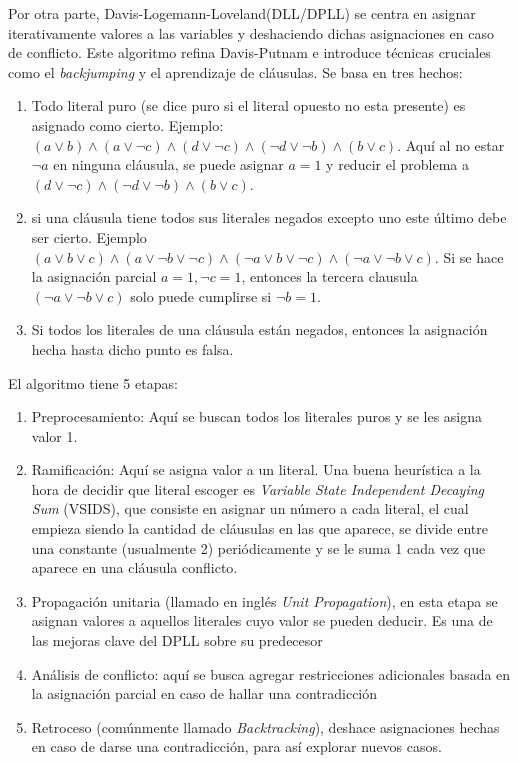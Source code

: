 \documentclass[12pt]{report}
\begin{document}
Por otra parte, Davis-Logemann-Loveland(DLL/DPLL) se centra en asignar iterativamente valores a las variables y deshaciendo dichas asignaciones en caso de conflicto. Este algoritmo refina Davis-Putnam e introduce técnicas cruciales como el \textit{backjumping} y el aprendizaje de cláusulas. Se basa en tres hechos: 
\begin{enumerate}
    \item Todo literal puro (se dice puro si el literal opuesto no esta presente) es asignado como cierto. Ejemplo: $(a\lor  b) \land (a\lor  \neg c) \land (d\lor  \neg c) \land (\neg d\lor  \neg b) \land (b\lor  c) $. Aquí al no estar $\neg a$ en ninguna cláusula, se puede asignar $a=1$ y reducir el problema a $(d\lor  \neg c) \land (\neg d\lor  \neg b) \land (b\lor  c) $.
    \item si una cláusula tiene todos sus literales negados excepto uno este último debe ser cierto. Ejemplo $(a \lor  b \lor  c)\land(a\lor \neg b\lor \neg c)\land(\neg a\lor  b\lor \neg c) \land(\neg a\lor  \neg b\lor  c).$ Si se hace la asignación parcial $a=1, \neg c=1$, entonces la tercera clausula $(\neg a\lor  \neg b\lor  c)$ solo puede cumplirse si $\neg b=1$.
    \item Si todos los literales de una cláusula están negados, entonces la asignación hecha hasta dicho punto es falsa.\\
\end{enumerate}


El algoritmo tiene 5 etapas:
\begin{enumerate}
    \item Preprocesamiento: Aquí se buscan todos los literales puros y se les asigna valor 1.
    \item Ramificación: Aquí se asigna valor a un literal. Una buena heurística a la hora de decidir que literal escoger es \textit{Variable State Independent Decaying Sum} (VSIDS), que consiste en asignar un número a cada literal, el cual empieza siendo la cantidad de cláusulas en las que aparece, se divide entre una constante (usualmente 2) periódicamente y se le suma 1 cada vez que aparece en una cláusula conflicto.
    \item Propagación unitaria (llamado en inglés \textit{Unit Propagation}), en esta etapa se asignan valores a aquellos literales cuyo valor se pueden deducir. Es una de las mejoras clave del DPLL sobre su predecesor
    \item Análisis de conflicto: aquí se busca agregar restricciones adicionales basada en la asignación parcial en caso de hallar una contradicción
    \item Retroceso (comúnmente llamado \textit{Backtracking}), deshace asignaciones hechas en caso de darse una contradicción, para así explorar nuevos casos.\\
\end{enumerate}
\end{document}
